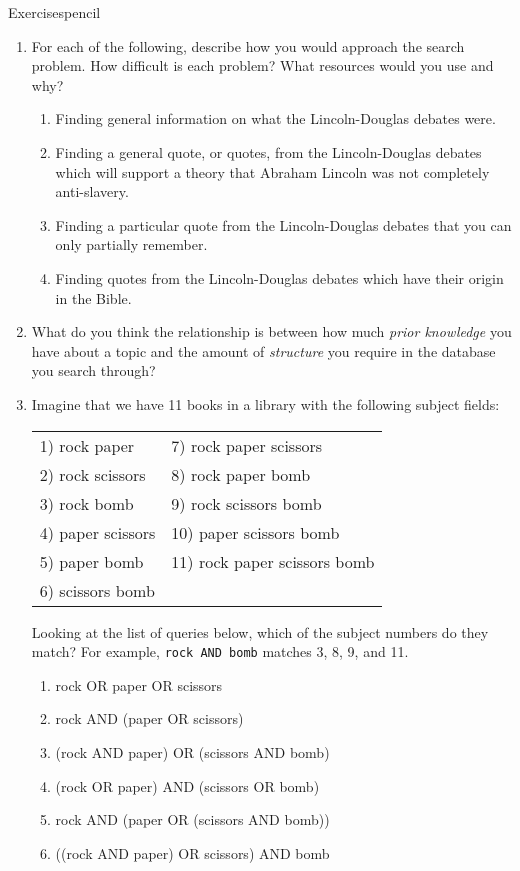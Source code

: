 \begin{tblsfilledsymbol}{Exercises}{pencil}

\begin{enumerate}
\item For each of the following, describe how you would
  approach the search problem.  How difficult is each problem? What resources would you use and why?
  \begin{enumerate}
  \item Finding general information on what the Lincoln-Douglas
    debates were.
  \item Finding a general quote, or quotes, from the Lincoln-Douglas
    debates which will support a theory that Abraham Lincoln was not
    completely anti-slavery.
  \item Finding a particular quote from the Lincoln-Douglas debates
    that you can only partially remember.
  \item Finding quotes from the Lincoln-Douglas debates which have
    their origin in the Bible.
  \end{enumerate}

\item  What do you think the relationship is between how
  much \emph{prior knowledge} you have about a topic and the amount
  of \emph{structure} you require in the database you search
  through?
\item  Imagine that we have 11 books in a library with
  the following subject fields:
  \begin{center}
    \begin{tabular}{ll}
      1) rock paper & 7) rock paper scissors\\
      2) rock scissors & 8) rock paper bomb\\
      3) rock bomb & 9) rock scissors bomb\\
      4) paper scissors & 10) paper scissors bomb\\
      5) paper bomb & 11) rock paper scissors bomb\\
      6) scissors bomb
    \end{tabular}
  \end{center}

  Looking at the list of queries below, which of the subject numbers
  do they match?  For example, \texttt{rock AND bomb} matches 3, 8, 9,
  and 11.

  \begin{enumerate}
    \renewcommand{\labelenumi}{\alph{enumi})}
  \item rock OR paper OR scissors
  \item rock AND (paper OR scissors)
  \item (rock AND paper) OR (scissors AND bomb)
  \item (rock OR paper) AND (scissors OR bomb)
  \item rock AND (paper OR (scissors AND bomb))
  \item ((rock AND paper) OR scissors) AND bomb
  \end{enumerate}


\end{enumerate}
\end{tblsfilledsymbol}
